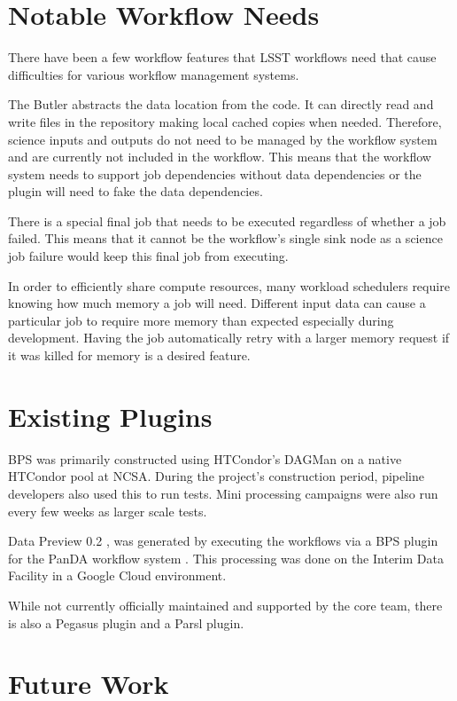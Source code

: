 \documentclass[11pt,twoside]{article}
\begin{document}
\section{Notable Workflow Needs}
There have been a few workflow features that LSST workflows need that
cause difficulties for various workflow management systems.

The Butler abstracts the data location from the code.  It can directly
read and write files in the repository making local cached copies when
needed.  Therefore, science inputs and outputs do not need to be managed
by the workflow system and are currently not included in the workflow.
This means that the workflow system needs to support job dependencies
without data dependencies or the plugin will need to fake the data
dependencies.

There is a special final job that needs to be executed regardless of
whether a job failed.  This means that it cannot be the workflow's
single sink node as a science job failure would keep this final job
from executing.


In order to efficiently share compute resources, many workload schedulers
require knowing how much memory a job will need.  Different input data can
cause a particular job to require more memory than expected especially
during development.  Having the job automatically retry with a larger
memory request if it was killed for memory is a desired feature.

\section{Existing Plugins}
BPS was primarily constructed using HTCondor's \citep{10.1002/cpe.938}
DAGMan on a native HTCondor pool at NCSA.  During the project's
construction period, pipeline developers also used this to run tests.
Mini processing campaigns were also run every few weeks as larger
scale tests.

Data Preview 0.2 \citep[DP0.2;][]{RTN-039}, was generated by
executing the workflows via a BPS plugin for the PanDA workflow system
\citep{10.1088/1742-6596/331/7/072024}.  This processing was done on
the Interim Data Facility in a Google Cloud environment.

While not currently officially maintained and supported by the core team,
there is also a Pegasus \citep{10.1016/j.future.2014.10.008} plugin and 
a Parsl \citep{10.1145/3307681.3325400} plugin.

\section{Future Work}
\end{document}
